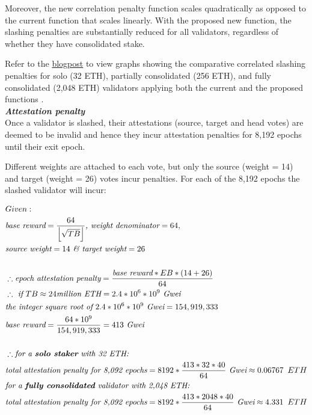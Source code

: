Moreover, the new correlation penalty function scales quadratically as opposed to the current function that scales linearly. With the proposed new function, the slashing penalties are substantially reduced for all validators, regardless of whether they have consolidated stake.

Refer to the \href{https://notes.ethereum.org/@mikeneuder/slashings-eip-7251}{blogpost} to view graphs showing the comparative correlated slashing penalties for solo (32 ETH), partially consolidated (256 ETH), and fully consolidated (2,048 ETH) validators applying both the current and the proposed functions \cite{Neuder2023d}. \\

\noindent
\textbf{\textit{Attestation penalty}} \\
Once a validator is slashed, their attestations (source, target and head votes) are deemed to be invalid and hence they incur attestation penalties for 8,192 epochs until their exit epoch. 

Different weights are attached to each vote, but only the source (weight = 14) and target (weight = 26) votes incur penalties. For each of the 8,192 epochs the slashed validator will incur:

\begin{equation*}
\begin{split}
& Given:\\
& \textit{base reward} = \frac{64}{ \left\lfloor \sqrt{TB} \right\rfloor} \textit{, weight denominator} = 64, \\
& \textit{source weight} = 14 \textit{  \& target weight} = 26\\
& \\
& \therefore \textit{epoch attestation penalty} = \frac{\textit{base reward} * EB * (14 + 26)}{64} \\
& \therefore \textit{ if } TB \approx 24 \textit{million ETH} = 2.4 * 10^6 * 10^9 \textit{ Gwei}\\
& \textit{the integer square root of } 2.4 * 10^6 * 10^9 \textit{ Gwei} = 154,919,333 \\
& \textit{base reward} = \frac{64 * 10^9}{154,919,333} = 413 \textit{ Gwei} \\
& \\
& \therefore \textit{for a \textbf{solo staker} with 32 ETH:} \\
& \textit{total attestation penalty for 8,092 epochs} = 8192 * \frac{413*32*40}{64}  \textit{ Gwei}  \approx 0.06767 \texttt{ } ETH \\
& \textit{for a \textbf{fully consolidated} validator with 2,048 ETH:} \\
& \textit{total attestation penalty for 8,092 epochs} = 8192 * \frac{413*2048*40}{64}  \textit{ Gwei}\approx 4.331 \texttt{ } ETH \\
\end{split}
\end{equation*}

